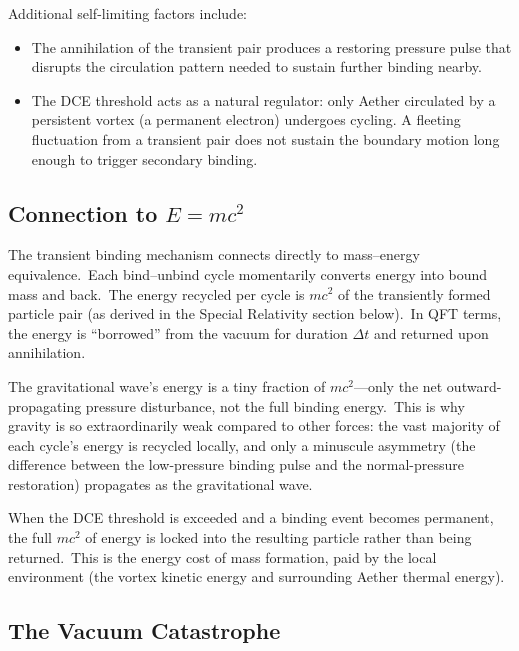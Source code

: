 ﻿\documentclass[12pt,letterpaper]{article}
\begin{document}
Additional self-limiting factors include:

\begin{itemize}[leftmargin=2em]
  \item The annihilation of the transient pair produces a restoring pressure pulse that
    disrupts the circulation pattern needed to sustain further binding nearby.

  \item The DCE threshold acts as a natural regulator: only Aether circulated by a
    persistent vortex (a permanent electron) undergoes cycling.
    A fleeting fluctuation from a transient pair does not sustain the boundary
    motion long enough to trigger secondary binding.
\end{itemize}


\subsection{Connection to \texorpdfstring{$E = mc^2$}{E = mc²}}
\label{sec:emc2}

The transient binding mechanism connects directly to mass--energy equivalence.\ Each bind--unbind cycle momentarily converts energy into bound mass and back.\ The energy recycled per
cycle is $mc^2$ of the transiently formed particle pair (as derived in the Special Relativity
section below).\ In QFT terms, the energy is ``borrowed'' from the vacuum for duration
$\Delta t$ and returned upon annihilation.

The gravitational wave's energy is a tiny fraction of $mc^2$---only the net outward-propagating pressure disturbance, not the full binding energy.\ This is why gravity is so
extraordinarily weak compared to other forces: the vast majority of each cycle's energy
is recycled locally, and only a minuscule asymmetry (the difference between the low-pressure binding pulse and the normal-pressure restoration) propagates as the gravitational
wave.

When the DCE threshold is exceeded and a binding event becomes permanent, the full $mc^2$
of energy is locked into the resulting particle rather than being returned.\ This is the
energy cost of mass formation, paid by the local environment (the vortex kinetic energy
and surrounding Aether thermal energy).


\subsection{The Vacuum Catastrophe}
\end{document}
